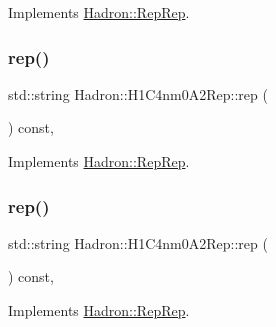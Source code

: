 Implements \mbox{\hyperlink{structHadron_1_1RepRep_ab3213025f6de249f7095892109575fde}{Hadron\+::\+Rep\+Rep}}.

\mbox{\label{structHadron_1_1H1C4nm0A2Rep_aa814381161d711ca3fb036897c27ec86}} 
\subsubsection{\texorpdfstring{rep()}{rep()}\hspace{0.1cm}{\footnotesize\ttfamily [2/5]}}
{\footnotesize\ttfamily std\+::string Hadron\+::\+H1\+C4nm0\+A2\+Rep\+::rep (\begin{DoxyParamCaption}{ }\end{DoxyParamCaption}) const\hspace{0.3cm}{\ttfamily [inline]}, {\ttfamily [virtual]}}



Implements \mbox{\hyperlink{structHadron_1_1RepRep_ab3213025f6de249f7095892109575fde}{Hadron\+::\+Rep\+Rep}}.

\mbox{\label{structHadron_1_1H1C4nm0A2Rep_aa814381161d711ca3fb036897c27ec86}} 
\subsubsection{\texorpdfstring{rep()}{rep()}\hspace{0.1cm}{\footnotesize\ttfamily [3/5]}}
{\footnotesize\ttfamily std\+::string Hadron\+::\+H1\+C4nm0\+A2\+Rep\+::rep (\begin{DoxyParamCaption}{ }\end{DoxyParamCaption}) const\hspace{0.3cm}{\ttfamily [inline]}, {\ttfamily [virtual]}}



Implements \mbox{\hyperlink{structHadron_1_1RepRep_ab3213025f6de249f7095892109575fde}{Hadron\+::\+Rep\+Rep}}.

\mbox{\label{structHadron_1_1H1C4nm0A2Rep_aa814381161d711ca3fb036897c27ec86}} 
